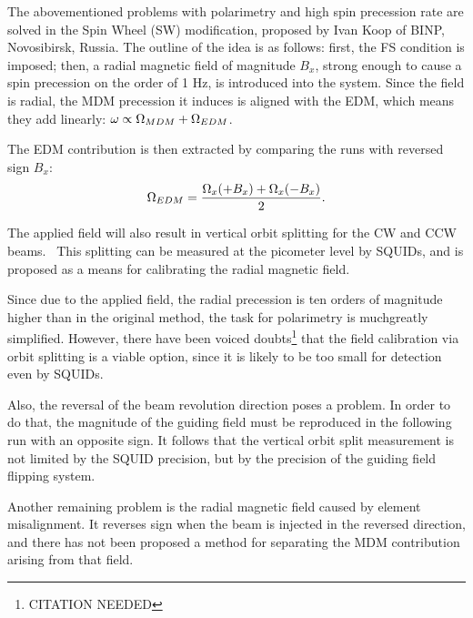 \documentclass{article}
\begin{document}
The abovementioned problems with polarimetry and high spin precession rate are solved in the Spin Wheel (SW) modification, proposed by Ivan Koop of BINP, Novosibirsk, Russia. The outline of the idea is as follows: first, the FS condition is imposed; then, a radial magnetic field of magnitude $B_x$, strong enough to cause a spin precession on the order of 1 Hz, is introduced into the system. Since the field is radial, the MDM precession it induces is aligned with the EDM, which means they add linearly: $\omega \propto \Omega_{MDM} + \Omega_{EDM}$.

The EDM contribution is then extracted by comparing the runs with reversed sign $B_x$:~\cite[p. 1963]{Koop:IPAC13}
\[
\Omega_{EDM} = \frac{\Omega_x(+B_x) + \Omega_x(-B_x)}{2}.
\]

The applied field will also result in vertical orbit splitting for the CW and CCW beams.~\cite[p. 8]{Koop:SW_Presentation} This splitting can be measured at the picometer level by SQUIDs, and is proposed as a means for calibrating the radial magnetic field.

Since due to the applied field, the radial precession is ten orders of magnitude higher than in the original method, the task for polarimetry is muchgreatly simplified. However, there have been voiced doubts\footnote{CITATION NEEDED} that the field calibration via orbit splitting is a viable option, since it is likely to be too small for detection even by SQUIDs.

Also, the reversal of the beam revolution direction poses a problem. In order to do that, the magnitude of the guiding field must be reproduced in the following run with an opposite sign. It follows that the vertical orbit split measurement is not limited by the SQUID precision, but by the precision of the guiding field flipping system.

Another remaining problem is the radial magnetic field caused by element misalignment. It reverses sign when the beam is injected in the reversed direction, and there has not been proposed a method for separating the MDM contribution arising from that field.
\end{document}
